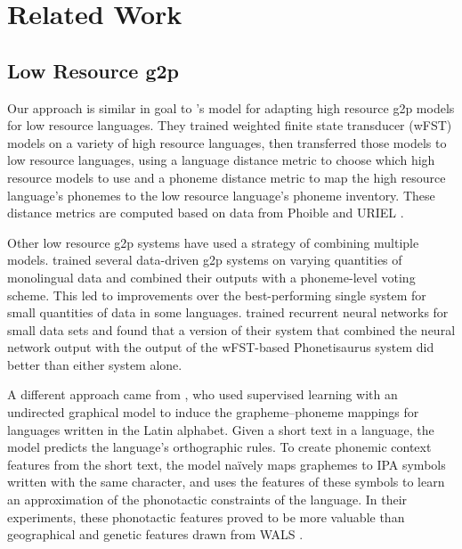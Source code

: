 \documentclass[11pt,letterpaper]{article}
\begin{document}
\section{Related Work}
\subsection{Low Resource g2p}
Our approach is similar in goal to 's model for adapting high resource g2p models for low resource languages. They trained weighted finite state transducer (wFST) models on a variety of high resource languages, then transferred those models to low resource languages, using a language distance metric to choose which high resource models to use and a phoneme distance metric to map the high resource language's phonemes to the low resource language's phoneme inventory. These distance metrics are computed based on data from Phoible \cite{phoible} and URIEL \cite{littell2017uriel}.

Other low resource g2p systems have used a strategy of combining multiple models.  trained several data-driven g2p systems on varying quantities of monolingual data and combined their outputs with a phoneme-level voting scheme. This led to improvements over the best-performing single system for small quantities of data in some languages.  trained recurrent neural networks for small data sets and found that a version of their system that combined the neural network output with the output of the wFST-based Phonetisaurus system \cite{novak2016phonetisaurus} did better than either system alone.

A different approach came from , who used supervised learning with an undirected graphical model to induce the grapheme--phoneme mappings for languages written in the Latin alphabet. Given a short text in a language, the model predicts the language's orthographic rules. To create phonemic context features from the short text, the model na\"ively maps graphemes to IPA symbols written with the same character, and uses the features of these symbols to learn an approximation of the phonotactic constraints of the language. In their experiments, these phonotactic features proved to be more valuable than geographical and genetic features drawn from WALS \cite{wals}.
\end{document}
